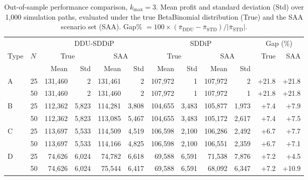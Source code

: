 \begin{table}[ht]
\centering
\caption{Out-of-sample performance comparison, $k_{\max}=3$. Mean profit and standard deviation (Std) over 1{,}000 simulation paths, evaluated under the true BetaBinomial distribution (True) and the SAA scenario set (SAA). Gap\% $= 100\times(\bar\pi_{\text{DDU}} - \bar\pi_{\text{STD}})/|\bar\pi_{\text{STD}}|$.}
\label{tab:perf_k3}
\small
\begin{tabular}{ll rr rr rr rr rr}
\toprule
 & & \multicolumn{4}{c}{DDU-SDDiP} & \multicolumn{4}{c}{SDDiP} & \multicolumn{2}{c}{Gap (\%)} \\
\cmidrule(lr){3-6}\cmidrule(lr){7-10}\cmidrule(lr){11-12}
Type & $N$ & \multicolumn{2}{c}{True} & \multicolumn{2}{c}{SAA} & \multicolumn{2}{c}{True} & \multicolumn{2}{c}{SAA} & True & SAA \\
\cmidrule(lr){3-4}\cmidrule(lr){5-6}\cmidrule(lr){7-8}\cmidrule(lr){9-10}
& & Mean & Std & Mean & Std & Mean & Std & Mean & Std & & \\
\midrule
A & 25 & 131,460 & 2 & 131,461  & 2 & 107,972 & 1 & 107,972  & 2 & +21.8 & +21.8 \\
 & 50 & 131,460 & 2 & 131,460  & 2 & 107,972 & 1 & 107,972  & 1 & +21.8 & +21.8 \\
\midrule
B & 25 & 112,362 & 5,823 & 114,281  & 3,808 & 104,655 & 3,483 & 105,877  & 1,973 & +7.4 & +7.9 \\
 & 50 & 112,362 & 5,823 & 113,085  & 5,467 & 104,655 & 3,483 & 105,172  & 2,617 & +7.4 & +7.5 \\
\midrule
C & 25 & 113,697 & 5,533 & 114,509  & 4,519 & 106,598 & 2,100 & 106,286  & 2,492 & +6.7 & +7.7 \\
 & 50 & 113,697 & 5,533 & 114,166  & 4,825 & 106,598 & 2,100 & 106,551  & 2,359 & +6.7 & +7.1 \\
\midrule
D & 25 & 74,626 & 6,024 & 74,782  & 6,618 & 69,588 & 6,591 & 71,538  & 7,876 & +7.2 & +4.5 \\
 & 50 & 74,626 & 6,024 & 75,544  & 6,417 & 69,588 & 6,591 & 68,092  & 6,347 & +7.2 & +10.9 \\
\bottomrule
\end{tabular}
\end{table}